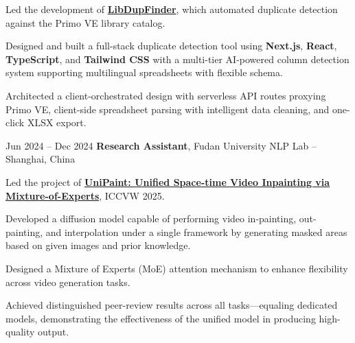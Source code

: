 \vspace{0.10 cm}
\begin{onecolentry}
    \begin{highlights}
        \item {\ResumeBulletFont Led the development of \href{lib-dup-finder.vercel.app}{\textbf{LibDupFinder}}, which automated duplicate detection against the Primo VE library catalog.}
        \item {\ResumeBulletFont Designed and built a full-stack duplicate detection tool using \textbf{Next.js}, \textbf{React}, \textbf{TypeScript}, and \textbf{Tailwind CSS} with a multi-tier AI-powered column detection system supporting multilingual spreadsheets with flexible schema.}
        \item {\ResumeBulletFont Architected a client-orchestrated design with serverless API routes proxying Primo VE, client-side spreadsheet parsing with intelligent data cleaning, and one-click XLSX export.}
    \end{highlights}
\end{onecolentry}

\vspace{0.20 cm}
\begin{twocolentry}{
        Jun 2024 -- Dec 2024
    }
    {\ResumeEntryTitleFont\textbf{Research Assistant}}, {\ResumeEntryMetaFont Fudan University NLP Lab -- Shanghai, China}
\end{twocolentry}

\vspace{0.10 cm}
\begin{onecolentry}
    \begin{highlights}
        \item {\ResumeBulletFont Led the project of \href{https://arxiv.org/abs/2412.06340}{\textbf{UniPaint: Unified Space-time Video Inpainting via Mixture-of-Experts}}, ICCVW 2025.}
        \item {\ResumeBulletFont Developed a diffusion model capable of performing video in-painting, out-painting, and interpolation under a single framework by generating masked areas based on given images and prior knowledge.}
        \item {\ResumeBulletFont Designed a Mixture of Experts (MoE) attention mechanism to enhance flexibility across video generation tasks.}
        \item {\ResumeBulletFont Achieved distinguished peer-review results across all tasks---equaling dedicated models, demonstrating the effectiveness of the unified model in producing high-quality output.}
    \end{highlights}
\end{onecolentry}
